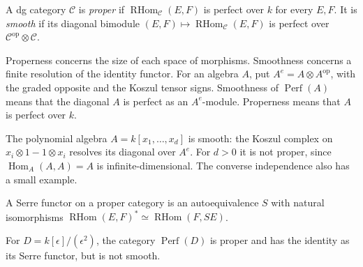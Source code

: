 \begin{definition}\label{cygeom:def:finiteness}
A dg category $\mathcal C$ is \emph{proper} if
$\operatorname{RHom}_{\mathcal C}(E,F)$ is perfect over $k$ for every
$E,F$. It is \emph{smooth} if its diagonal bimodule
$(E,F)\mapsto\operatorname{RHom}_{\mathcal C}(E,F)$ is perfect over
$\mathcal C^{\mathrm{op}}\otimes\mathcal C$.
\end{definition}

Properness concerns the size of each space of morphisms. Smoothness
concerns a finite resolution of the identity functor. For an algebra
$A$, put $A^e=A\otimes A^{\mathrm{op}}$, with the graded opposite
and the Koszul tensor signs. Smoothness of $\operatorname{Perf}(A)$
means that the diagonal $A$ is perfect as an $A^e$-module. Properness
means that $A$ is perfect over $k$.

The polynomial algebra $A=k[x_1,\ldots,x_d]$ is smooth: the Koszul
complex on $x_i\otimes1-1\otimes x_i$ resolves its diagonal over $A^e$.
For $d>0$ it is not proper, since
$\operatorname{Hom}_A(A,A)=A$ is infinite-dimensional. The converse
independence also has a small example.

A Serre functor on a proper category is an autoequivalence $S$ with
natural isomorphisms
$\operatorname{RHom}(E,F)^*\simeq\operatorname{RHom}(F,SE)$.

\begin{proposition}\label{cygeom:prop:dual-numbers}
For $D=k[\epsilon]/(\epsilon^2)$, the category
$\operatorname{Perf}(D)$ is proper and has the identity as its Serre
functor, but is not smooth.
\end{proposition}

